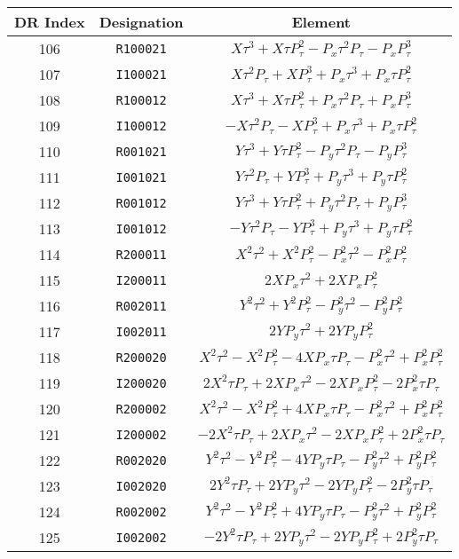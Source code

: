 {{\begin{center}
\newpage
\hspace*{-.5in}\begin{tabular}{ccc}
DR Index&Designation&Element\\ \hline
  106&{\tt R100021}&$X{\tau}^{3}+X{\tau}P_{\tau}^{2}-P_x{\tau}^{2}P_{\tau}-P_xP_{\tau}^{3}$\\
  107&{\tt I100021}&$X{\tau}^{2}P_{\tau}+XP_{\tau}^{3}+P_x{\tau}^{3}+P_x{\tau}P_{\tau}^{2}$\\
  108&{\tt R100012}&$X{\tau}^{3}+X{\tau}P_{\tau}^{2}+P_x{\tau}^{2}P_{\tau}+P_xP_{\tau}^{3}$\\
  109&{\tt I100012}&$-X{\tau}^{2}P_{\tau}-XP_{\tau}^{3}+P_x{\tau}^{3}+P_x{\tau}P_{\tau}^{2}$\\
  110&{\tt R001021}&$Y{\tau}^{3}+Y{\tau}P_{\tau}^{2}-P_y{\tau}^{2}P_{\tau}-P_yP_{\tau}^{3}$\\
  111&{\tt I001021}&$Y{\tau}^{2}P_{\tau}+YP_{\tau}^{3}+P_y{\tau}^{3}+P_y{\tau}P_{\tau}^{2}$\\
  112&{\tt R001012}&$Y{\tau}^{3}+Y{\tau}P_{\tau}^{2}+P_y{\tau}^{2}P_{\tau}+P_yP_{\tau}^{3}$\\
  113&{\tt I001012}&$-Y{\tau}^{2}P_{\tau}-YP_{\tau}^{3}+P_y{\tau}^{3}+P_y{\tau}P_{\tau}^{2}$\\
  114&{\tt R200011}&$X^{2}{\tau}^{2}+X^{2}P_{\tau}^{2}-P_x^{2}{\tau}^{2}-P_x^{2}P_{\tau}^{2}$\\
  115&{\tt I200011}&$2XP_x{\tau}^{2}+2XP_xP_{\tau}^{2}$\\
  116&{\tt R002011}&$Y^{2}{\tau}^{2}+Y^{2}P_{\tau}^{2}-P_y^{2}{\tau}^{2}-P_y^{2}P_{\tau}^{2}$\\
  117&{\tt I002011}&$2YP_y{\tau}^{2}+2YP_yP_{\tau}^{2}$\\
118&{\tt R200020}&$X^{2}{\tau}^{2}-X^{2}P_{\tau}^{2}-4XP_x{\tau}P_{\tau}-P_x^{2}{\tau}^{2}+P_x^{2}P_{\tau}^{2}$\\  119&{\tt I200020}&$2X^{2}{\tau}P_{\tau}+2XP_x{\tau}^{2}-2XP_xP_{\tau}^{2}-2P_x^{2}{\tau}P_{\tau}$\\  120&{\tt R200002}&$X^{2}{\tau}^{2}-X^{2}P_{\tau}^{2}+4XP_x{\tau}P_{\tau}-P_x^{2}{\tau}^{2}+P_x^{2}P_{\tau}^{2}$\\
121&{\tt I200002}&$-2X^{2}{\tau}P_{\tau}+2XP_x{\tau}^{2}-2XP_xP_{\tau}^{2}+2P_x^{2}{\tau}P_{\tau}$\\  122&{\tt R002020}&$Y^{2}{\tau}^{2}-Y^{2}P_{\tau}^{2}-4YP_y{\tau}P_{\tau}-P_y^{2}{\tau}^{2}+P_y^{2}P_{\tau}^{2}$\\  123&{\tt I002020}&$2Y^{2}{\tau}P_{\tau}+2YP_y{\tau}^{2}-2YP_yP_{\tau}^{2}-2P_y^{2}{\tau}P_{\tau}$\\  124&{\tt R002002}&$Y^{2}{\tau}^{2}-Y^{2}P_{\tau}^{2}+4YP_y{\tau}P_{\tau}-P_y^{2}{\tau}^{2}+P_y^{2}P_{\tau}^{2}$\\  125&{\tt I002002}&$-2Y^{2}{\tau}P_{\tau}+2YP_y{\tau}^{2}-2YP_yP_{\tau}^{2}+2P_y^{2}{\tau}P_{\tau}$\\

\end{tabular}
\end{center}}}
